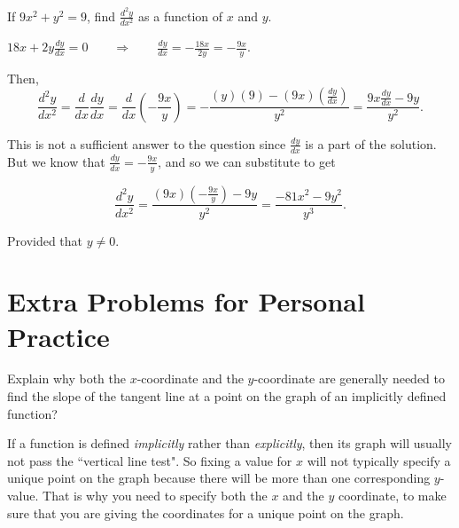 \documentclass[nooutcomes]{ximera}
\renewenvironment{freeResponse}{
\ifhandout\setbox0\vbox\bgroup\else
\begin{trivlist}\item[\hskip \labelsep\bfseries Solution:\hspace{2ex}]
\fi}
{\ifhandout\egroup\else
\end{trivlist}
\fi}
\newcommand{\dd}[2][]{\frac{d #1}{d #2}}
\newcommand{\ddx}{\frac{d}{dx}}
\begin{document}
\begin{problem}
  If $9x^2 + y^2 = 9$, find $\dd[^2 y]{x^2}$ as a function of $x$ and $y$.
  		\begin{freeResponse}
		$18x + 2y \dd[y]{x} = 0 \qquad \Longrightarrow \qquad \dd[y]{x} = - \frac{18x}{2y} = - \frac{9x}{y}$.
		
		Then,
		$$ \dd[^2y]{x^2} = \ddx \dd[y]{x} = \ddx \left( - \frac{9x}{y} \right) = - \frac{(y)(9) - (9x)(\dd[y]{x} )}{y^2} = \frac{9x\dd[y]{x} - 9y}{y^2}. $$
		
		This is not a sufficient answer to the question since $\dd[y]{x}$ is a part of the solution.  But we know that $\dd[y]{x} = -\frac{9x}{y}$, and so we can substitute to get
		
		$$ \dd[^2y]{x^2} = \frac{(9x) \left(- \frac{9x}{y} \right) - 9y}{y^2} = \frac{-81x^2 - 9y^2}{y^3}. $$
		
		Provided that $y \neq 0$.  
		\end{freeResponse}
\end{problem}

\section{Extra Problems for Personal Practice}
\begin{problem}
  Explain why both the $x$-coordinate and the $y$-coordinate are generally needed to find the slope of the tangent line at a point on the graph of an implicitly defined function?
	\begin{freeResponse}
          If a function is defined \emph{implicitly} rather than \emph{explicitly}, then its graph will usually not pass the ``vertical line test".
          So fixing a value for $x$ will not typically specify a unique point on the graph because there will be more than one corresponding $y$-value.
          That is why you need to specify both the $x$ and the $y$ coordinate, to make sure that you are giving the coordinates for a unique point on the graph.
	\end{freeResponse}	
\end{problem}
\end{document}
